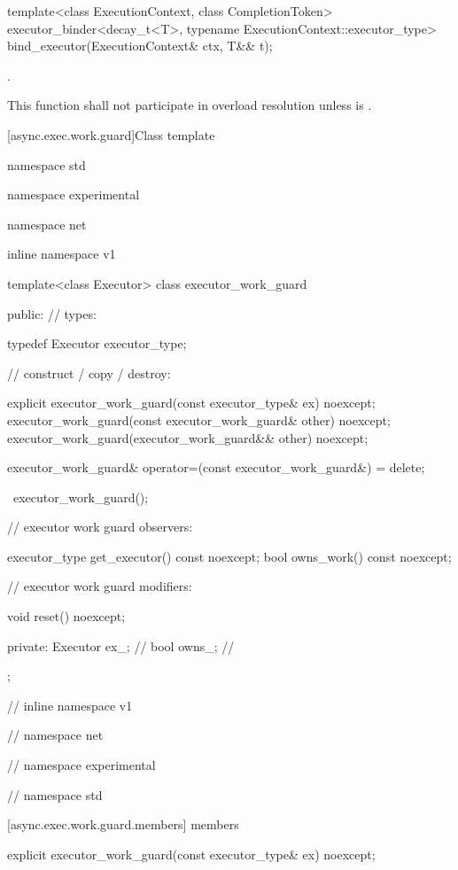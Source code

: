 \begin{itemdecl}
template<class ExecutionContext, class CompletionToken>
  executor_binder<decay_t<T>, typename ExecutionContext::executor_type>
    bind_executor(ExecutionContext& ctx, T&& t);
\end{itemdecl}

\begin{itemdescr}
\pnum
\returns {}.

\pnum
\remarks This function shall not participate in overload resolution unless  is .
\end{itemdescr}



[async.exec.work.guard]{Class template }

\begin{codeblock}
namespace std {
namespace experimental {
namespace net {
inline namespace v1 {

  template<class Executor>
  class executor_work_guard
  {
  public:
    // types:

    typedef Executor executor_type;

    // construct / copy / destroy:

    explicit executor_work_guard(const executor_type& ex) noexcept;
    executor_work_guard(const executor_work_guard& other) noexcept;
    executor_work_guard(executor_work_guard&& other) noexcept;

    executor_work_guard& operator=(const executor_work_guard&) = delete;

    ~executor_work_guard();

    // executor work guard observers:

    executor_type get_executor() const noexcept;
    bool owns_work() const noexcept;

    // executor work guard modifiers:

    void reset() noexcept;

  private:
    Executor ex_; // \expos
    bool owns_; // \expos
  };

} // inline namespace v1
} // namespace net
} // namespace experimental
} // namespace std
\end{codeblock}


[async.exec.work.guard.members]{ members}

\begin{itemdecl}
explicit executor_work_guard(const executor_type& ex) noexcept;
\end{itemdecl}


